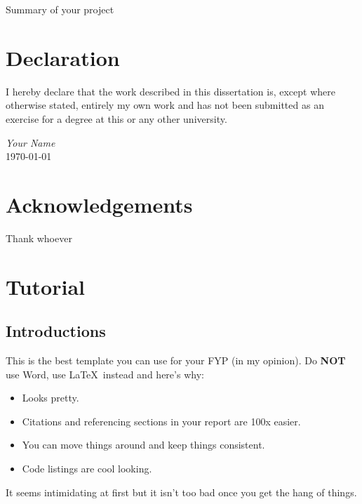 \documentclass[]{TUD_CS_FYP_Report}
\begin{document}
\maketitle

\abstract
Summary of your project

\chapter*{Declaration}
I hereby declare that the work described in this dissertation is, except where otherwise stated, entirely my own work and has not been submitted as an exercise for a degree at this or any
other university.

\vspace{0.5cm}
\begin{flushright}
    \textit{Your Name}\\
    \vspace{0.25cm}
    \today
\end{flushright}
\pagebreak

\chapter*{Acknowledgements}
Thank whoever

\pagebreak
\tableofcontents
\pagebreak
\listoffigures
\pagebreak

\chapter{Tutorial}
\section{Introductions}
This is the best template you can use for your FYP (in my opinion). Do \textbf{NOT} use Word, use \LaTeX\ instead and here's why:

\begin{itemize}
    \item Looks pretty.
    \item Citations and referencing sections in your report are 100x easier.
    \item You can move things around and keep things consistent.
    \item Code listings are cool looking.
\end{itemize}

It seems intimidating at first but it isn't too bad once you get the hang of things.
\end{document}
